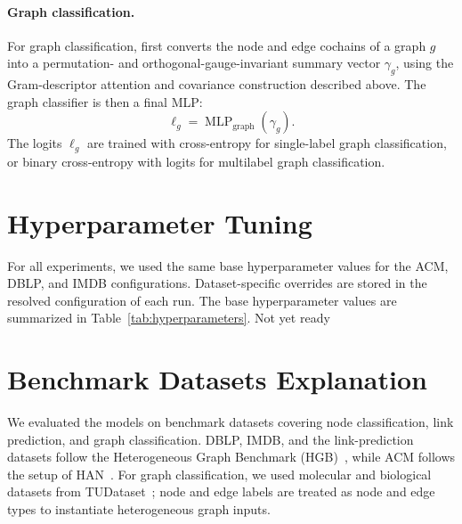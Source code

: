 \paragraph{Graph classification.}
For graph classification, \sheafcovpool{} first converts the node and edge cochains of a graph
\(g\) into a permutation- and orthogonal-gauge-invariant summary vector \(\gamma_g\), using the
Gram-descriptor attention and covariance construction described above.  The graph classifier is
then a final MLP:
\begin{equation}
  \ell_g
  =
  \operatorname{MLP}_{\mathrm{graph}}(\gamma_g).
  \label{eq:graph-readout}
\end{equation}
The logits \(\ell_g\) are trained with cross-entropy for single-label graph classification, or
binary cross-entropy with logits for multilabel graph classification.

\section{Hyperparameter Tuning}

For all experiments, we used the same base hyperparameter values for the ACM, DBLP, and IMDB configurations. Dataset-specific overrides are stored in the resolved configuration of each run. The base hyperparameter values are summarized in Table~\ref{tab:hyperparameters}.
Not yet ready
\label{app:hyperparameters}

\begin{table}[t]
  \centering
  \caption{Base hyperparameter values used in the ACM, DBLP, and IMDB
  configurations. Dataset-specific overrides are stored in the resolved
  configuration of each run.}
  \label{tab:hyperparameters}
  \scriptsize
  
\end{table}

\section{Benchmark Datasets Explanation}
\label{app:benchmark-datasets}

We evaluated the models on benchmark datasets covering node classification,
link prediction, and graph classification. DBLP, IMDB, and the link-prediction
datasets follow the Heterogeneous Graph Benchmark (HGB)~\cite{lv2021hgb}, while
ACM follows the setup of HAN~\cite{wang2019han}. For graph classification, we
used molecular and biological datasets from TUDataset~\cite{morris2020tudataset};
node and edge labels are treated as node and edge types to instantiate
heterogeneous graph inputs.

